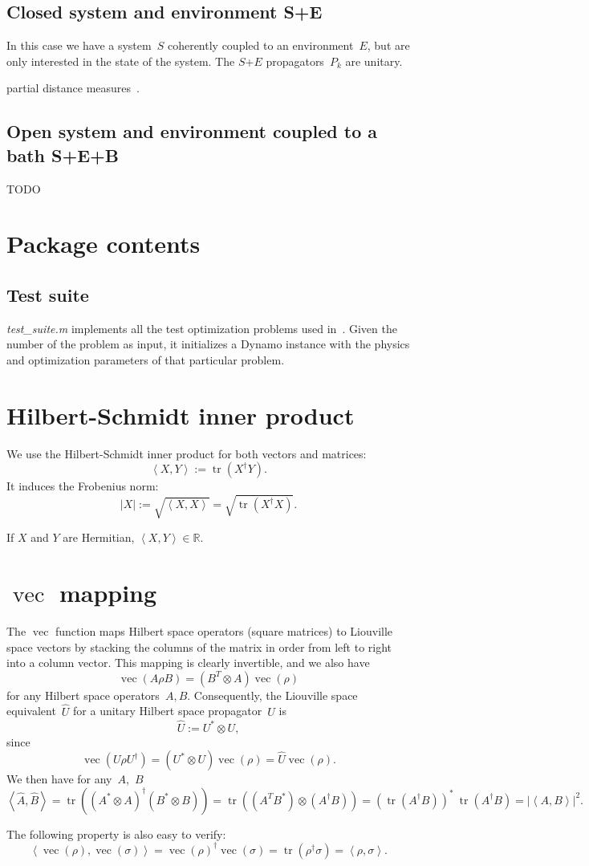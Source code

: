 \documentclass[aps, pra, a4paper, longbibliography]{revtex4}
\newcommand{\be}{\begin{equation}}
\newcommand{\ee}{\end{equation}}
\newcommand{\R}{{\mathbb R}}  %
\newcommand{\inprod}[2]{\left\langle #1, #2 \right\rangle}
\DeclareMathOperator{\tr}{tr}
\DeclareMathOperator{\cvec}{vec}
\begin{document}
\subsection{Closed system and environment S+E}

In this case we have a system~$S$ coherently coupled to an
environment~$E$, but are only interested in the state of the system.
The $S$+$E$ propagators~$P_k$ are unitary.

partial distance measures~\cite{kosut_2006}.

\subsection{Open system and environment coupled to a bath S+E+B}

TODO




\section{Package contents}

\subsection{Test suite}
\emph{test\_suite.m} implements all the test optimization problems used in~\cite{machnes_2011}.
Given the number of the problem as input, it initializes a Dynamo
instance with the physics and optimization parameters of that particular problem.

\appendix
\section{Hilbert-Schmidt inner product}

We use the Hilbert-Schmidt inner product for both vectors and matrices:
\be
\inprod{X}{Y} := \tr\left(X^\dagger Y\right).
\ee
It induces the Frobenius norm:
\be
|X| := \sqrt{\inprod{X}{X}} = \sqrt{\tr\left(X^\dagger X\right)}.
\ee

If $X$ and $Y$ are Hermitian, $\inprod{X}{Y} \in \R$.

\section{$\cvec$ mapping}
\label{sec:vec}

The $\cvec$ function maps Hilbert space operators (square matrices) to
Liouville space vectors by stacking the columns of the matrix in order
from left to right into a column vector. This mapping is clearly
invertible, and we also have
\be
\cvec(A \rho B) = (B^T \otimes A) \cvec(\rho)
\ee
for any Hilbert space operators~$A, B$.
Consequently, the Liouville space equivalent~$\hat{U}$ for a unitary Hilbert space
propagator~$U$ is
\be
\label{eq:L-unitary}
\hat{U} := U^* \otimes U,
\ee
since
\be
\cvec(U \rho U^\dagger) = (U^* \otimes U) \cvec(\rho) = \hat{U} \cvec(\rho).
\ee
We then have for any~$A$,~$B$
\be
\label{eq:hat-product}
\inprod{\hat{A}}{\hat{B}}
= \tr((A^* \otimes A)^\dagger (B^* \otimes B))
= \tr((A^T B^*) \otimes (A^\dagger B))
= (\tr(A^\dagger B))^* \: \tr(A^\dagger B)
= |\inprod{A}{B}|^2.
\ee

The following property is also easy to verify:
\be
\inprod{\cvec(\rho)}{\cvec(\sigma)} = \cvec(\rho)^\dagger \cvec(\sigma)
= \tr(\rho^\dagger \sigma) = \inprod{\rho}{\sigma}.
\ee






\end{document}
